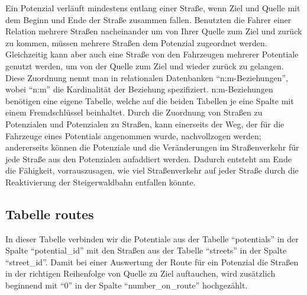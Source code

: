 \documentclass[fontsize=12pt,a4paper]{scrreprt}
\begin{document}
Ein Potenzial verläuft mindestens entlang einer Straße, wenn Ziel und Quelle mit dem Beginn und Ende der Straße zusammen fallen. Benutzten die Fahrer einer Relation mehrere Straßen nacheinander um von Ihrer Quelle zum Ziel und zurück zu kommen, müssen mehrere Straßen dem Potenzial zugeordnet werden. Gleichzeitig kann aber auch eine Straße von den Fahrzeugen mehrerer Potentiale genutzt werden, um von der Quelle zum Ziel und wieder zurück zu gelangen.\newline
\newline
Diese Zuordnung nennt man in relationalen Datenbanken \enquote{n:m-Beziehungen}, wobei \enquote{n:m} die Kardinalität der Beziehung spezifiziert. n:m-Beziehungen benötigen eine eigene Tabelle, welche auf die beiden Tabellen je eine Spalte mit einem Fremdschlüssel beinhaltet.\newline
\newline
Durch die Zuordnung von Straßen zu Potenzialen und Potenzialen zu Straßen, kann einerseits der Weg, der für die Fahrzeuge eines Potentials angenommen wurde, nachvollzogen werden; andererseits können die Potenziale und die Veränderungen im Straßenverkehr für jede Straße aus den Potenzialen aufaddiert werden. Dadurch entsteht am Ende die Fähigkeit, vorrauszusagen, wie viel Straßenverkehr auf jeder Straße durch die Reaktivierung der Steigerwaldbahn entfallen könnte.

\subsection{Tabelle routes}

In dieser Tabelle verbinden wir die Potentiale aus der Tabelle \enquote{potentials} in der Spalte \enquote{potential_id} mit den Straßen aus der Tabelle \enquote{streets} in der Spalte \enquote{street_id}. Damit bei einer Auswertung der Route für ein Potenzial die Straßen in der richtigen Reihenfolge von Quelle zu Ziel auftauchen, wird zusätzlich beginnend mit \enquote{0} in der Spalte \enquote{number_on_route} hochgezählt.
\end{document}
